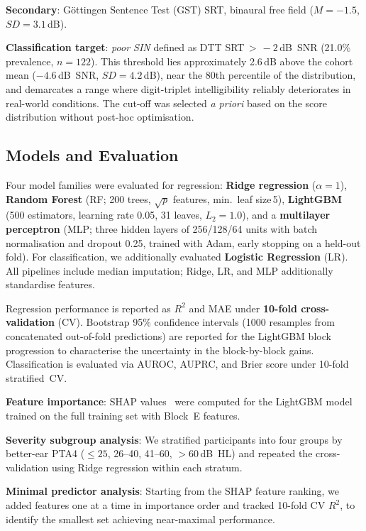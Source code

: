 \documentclass[conference]{IEEEtran}
\begin{document}
\textbf{Secondary}: Göttingen Sentence Test (GST) SRT, binaural free field
($M=-1.5$,\,$SD=3.1$\,dB).

\textbf{Classification target}: \textit{poor SIN} defined as DTT
SRT\,${>}\,-2$\,dB~SNR (21.0\% prevalence, $n=122$).  This threshold lies
approximately 2.6\,dB above the cohort mean ($-4.6$\,dB~SNR, $SD=4.2$\,dB),
near the 80th percentile of the distribution, and demarcates a range where
digit-triplet intelligibility reliably deteriorates in real-world conditions.
The cut-off was selected \emph{a priori} based on the score distribution
without post-hoc optimisation.

\subsection{Models and Evaluation}

Four model families were evaluated for regression: \textbf{Ridge
regression} ($\alpha=1$), \textbf{Random Forest} (RF; 200 trees, $\sqrt{p}$
features, min.\ leaf size\,5), \textbf{LightGBM} (500 estimators, learning
rate 0.05, 31 leaves, $L_2=1.0$), and a \textbf{multilayer perceptron}
(MLP; three hidden layers of 256/128/64 units with batch normalisation and
dropout 0.25, trained with Adam, early stopping on a held-out fold).
For classification, we additionally evaluated \textbf{Logistic Regression}
(LR).  All pipelines include median imputation; Ridge, LR, and MLP
additionally standardise features.

Regression performance is reported as $R^2$ and MAE under \textbf{10-fold
cross-validation} (CV).  Bootstrap 95\% confidence intervals (1000
resamples from concatenated out-of-fold predictions) are reported for the
LightGBM block progression to characterise the uncertainty in the
block-by-block gains.  Classification is evaluated via AUROC, AUPRC, and
Brier score under 10-fold stratified~CV.

\textbf{Feature importance}: SHAP values~\cite{Lundberg2017SHAP} were
computed for the LightGBM model trained on the full training set with
Block~E features.

\textbf{Severity subgroup analysis}: We stratified participants into four
groups by better-ear PTA4 (${\leq}25$, 26--40, 41--60, ${>}60$\,dB~HL) and
repeated the cross-validation using Ridge regression within each stratum.

\textbf{Minimal predictor analysis}: Starting from the SHAP feature
ranking, we added features one at a time in importance order and tracked
10-fold CV $R^2$, to identify the smallest set achieving near-maximal
performance.
\end{document}
